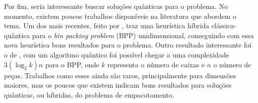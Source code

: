 Por fim, seria interessante buscar soluções quânticas para o problema.
No momento, existem poucos trabalhos disponíveis na literatura que abordem o tema.
Um dos mais recentes, feito por , traz uma heurística híbrida
clássica-quântica para o \textit{bin packing problem} (BPP) unidimensional, conseguindo com essa
nova heurística bons resultados para o problema.
Outro resultado interessante foi o de , com um algoritmo quântico
foi possível chegar a uma complexidade $3(\log_2 k)n$ para o BPP, onde $k$ representa o número de
caixas e $n$ o número de peças.
Trabalhos como esses ainda são raros, principalmente para dimensões maiores, mas os poucos que
existem indicam bons resultados para soluções quânticas, ou híbridas, do problema de empacotamento.
